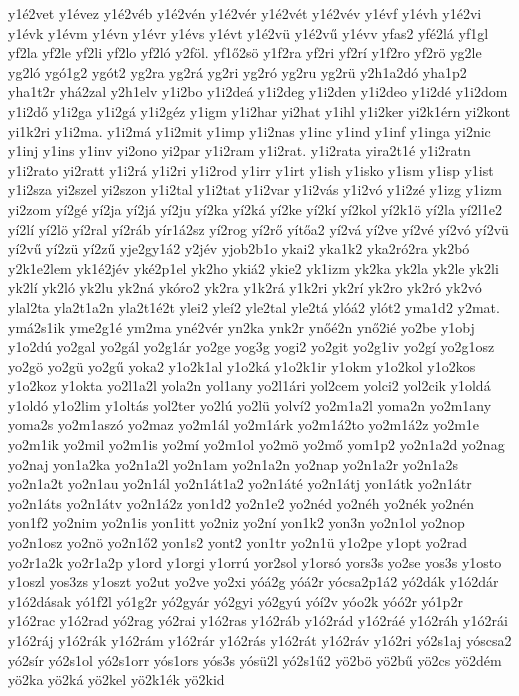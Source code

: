 {y1é2vet
y1évez
y1é2véb
y1é2vén
y1é2vér
y1é2vét
y1é2vév
y1évf
y1évh
y1é2vi
y1évk
y1évm
y1évn
y1évr
y1évs
y1évt
y1é2vü
y1é2vű
y1évv
yfas2
yfé2lá
yf1gl
yf2la
yf2le
yf2li
yf2lo
yf2ló
y2föl.
yf1ő2sö
y1f2ra
yf2ri
yf2rí
y1f2ro
yf2rö
yg2le
yg2ló
ygó1g2
ygót2
yg2ra
yg2rá
yg2ri
yg2ró
yg2ru
yg2rü
y2h1a2dó
yha1p2
yha1t2r
yhá2zal
y2h1elv
y1i2bo
y1i2deá
y1i2deg
y1i2den
y1i2deo
y1i2dé
y1i2dom
y1i2dő
y1i2ga
y1i2gá
y1i2géz
y1igm
y1i2har
yi2hat
y1ihl
y1i2ker
yi2k1érn
yi2kont
yi1k2ri
y1i2ma.
y1i2má
y1i2mit
y1imp
y1i2nas
y1inc
y1ind
y1inf
y1inga
yi2nic
y1inj
y1ins
y1inv
yi2ono
yi2par
y1i2ram
y1i2rat.
y1i2rata
yira2t1é
y1i2ratn
y1i2rato
yi2ratt
y1i2rá
y1i2ri
y1i2rod
y1irr
y1irt
y1ish
y1isko
y1ism
y1isp
y1ist
y1i2sza
yi2szel
yi2szon
y1i2tal
y1i2tat
y1i2var
y1i2vás
y1i2vó
y1i2zé
y1izg
y1izm
yi2zom
yí2gé
yí2ja
yí2já
yí2ju
yí2ka
yí2ká
yí2ke
yí2kí
yí2kol
yí2k1ö
yí2la
yí2l1e2
yí2lí
yí2lö
yí2ral
yí2ráb
yír1á2sz
yí2rog
yí2rő
yítőa2
yí2vá
yí2ve
yí2vé
yí2vó
yí2vü
yí2vű
yí2zü
yí2zű
yje2gy1á2
y2jév
yjob2b1o
ykai2
yka1k2
yka2ró2ra
yk2bó
y2k1e2lem
yk1é2jév
yké2p1el
yk2ho
ykiá2
ykie2
yk1izm
yk2ka
yk2la
yk2le
yk2li
yk2lí
yk2ló
yk2lu
yk2ná
ykóro2
yk2ra
y1k2rá
y1k2ri
yk2rí
yk2ro
yk2ró
yk2vó
ylal2ta
yla2t1a2n
yla2t1é2t
ylei2
yleí2
yle2tal
yle2tá
ylóá2
ylót2
yma1d2
y2mat.
ymá2s1ik
yme2g1é
ym2ma
yné2vér
yn2ka
ynk2r
ynőé2n
ynő2ié
yo2be
y1obj
y1o2dú
yo2gal
yo2gál
yo2g1ár
yo2ge
yog3g
yogi2
yo2git
yo2g1iv
yo2gí
yo2g1osz
yo2gö
yo2gü
yo2gű
yoka2
y1o2k1al
y1o2ká
y1o2k1ir
y1okm
y1o2kol
y1o2kos
y1o2koz
y1okta
yo2l1a2l
yola2n
yol1any
yo2l1ári
yol2cem
yolci2
yol2cik
y1oldá
y1oldó
y1o2lim
y1oltás
yol2ter
yo2lú
yo2lü
yolví2
yo2m1a2l
yoma2n
yo2m1any
yoma2s
yo2m1aszó
yo2maz
yo2m1ál
yo2m1árk
yo2m1á2to
yo2m1á2z
yo2m1e
yo2m1ik
yo2mil
yo2m1is
yo2mí
yo2m1ol
yo2mö
yo2mő
yom1p2
yo2n1a2d
yo2nag
yo2naj
yon1a2ka
yo2n1a2l
yo2n1am
yo2n1a2n
yo2nap
yo2n1a2r
yo2n1a2s
yo2n1a2t
yo2n1au
yo2n1ál
yo2n1át1a2
yo2n1áté
yo2n1átj
yon1átk
yo2n1átr
yo2n1áts
yo2n1átv
yo2n1á2z
yon1d2
yo2n1e2
yo2néd
yo2néh
yo2nék
yo2nén
yon1f2
yo2nim
yo2n1is
yon1itt
yo2niz
yo2ní
yon1k2
yon3n
yo2n1ol
yo2nop
yo2n1osz
yo2nö
yo2n1ő2
yon1s2
yont2
yon1tr
yo2n1ü
y1o2pe
y1opt
yo2rad
yo2r1a2k
yo2r1a2p
y1ord
y1orgi
y1orrú
yor2sol
y1orsó
yors3s
yo2se
yos3s
y1osto
y1oszl
yos3zs
y1oszt
yo2ut
yo2ve
yo2xi
yóá2g
yóá2r
yócsa2p1á2
yó2dák
y1ó2dár
y1ó2dásak
yó1f2l
yó1g2r
yó2gyár
yó2gyi
yó2gyú
yóí2v
yóo2k
yóó2r
yó1p2r
y1ó2rac
y1ó2rad
yó2rag
yó2rai
y1ó2ras
y1ó2ráb
y1ó2rád
y1ó2ráé
y1ó2ráh
y1ó2rái
y1ó2ráj
y1ó2rák
y1ó2rám
y1ó2rár
y1ó2rás
y1ó2rát
y1ó2ráv
y1ó2ri
yó2s1aj
yóscsa2
yó2sír
yó2s1ol
yó2s1orr
yós1ors
yós3s
yósü2l
yó2s1ű2
yö2bö
yö2bű
yö2cs
yö2dém
yö2ka
yö2ká
yö2kel
yö2k1ék
yö2kid
}
